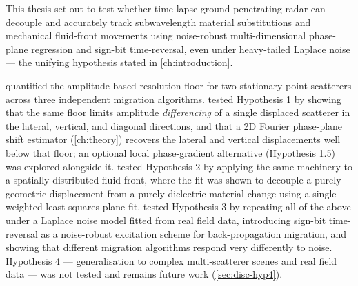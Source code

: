 \label{ch:summary}


This thesis set out to test whether time-lapse ground-penetrating radar can
decouple and accurately track subwavelength material substitutions and
mechanical fluid-front movements using noise-robust multi-dimensional
phase-plane regression and sign-bit time-reversal, even under heavy-tailed
Laplace noise --- the unifying hypothesis stated in \cref{ch:introduction}.

 quantified the amplitude-based resolution floor
for two stationary point scatterers across three independent migration
algorithms.  tested Hypothesis 1 by showing that the same
floor limits amplitude \emph{differencing} of a single displaced scatterer
in the lateral, vertical, and diagonal directions, and that a 2D Fourier
phase-plane shift estimator (\cref{ch:theory}) recovers the lateral and
vertical displacements well below that floor; an optional local
phase-gradient alternative (Hypothesis 1.5) was explored alongside it.
 tested Hypothesis 2 by applying the same machinery to a
spatially distributed fluid front, where the fit was shown to decouple a
purely geometric displacement from a purely dielectric material change
using a single weighted least-squares plane fit.  tested
Hypothesis 3 by repeating all of the above under a Laplace noise model
fitted from real field data, introducing sign-bit time-reversal as a
noise-robust excitation scheme for back-propagation migration, and showing
that different migration algorithms respond very differently to noise.
Hypothesis 4 --- generalisation to complex multi-scatterer scenes and real
field data --- was not tested and remains future work (\cref{sec:disc-hyp4}).

